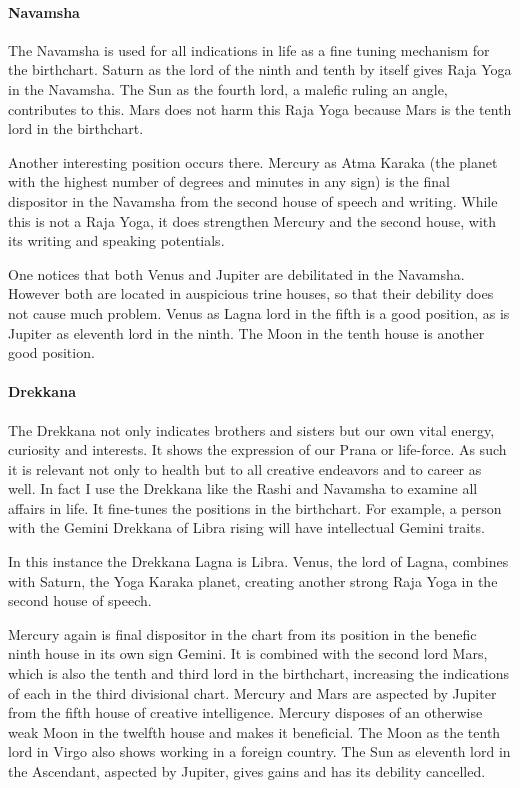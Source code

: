  

\paragraph{Navamsha}

The Navamsha is used for all indications in life as a fine tuning mechanism for the birthchart. Saturn as the lord of the ninth and tenth by itself gives Raja Yoga in the Navamsha. The Sun as the fourth lord, a malefic ruling an angle, contributes to this. Mars does not harm this Raja Yoga because Mars is the tenth lord in the birthchart.

 

Another interesting position occurs there. Mercury as Atma Karaka (the planet with the highest number of degrees and minutes in any sign) is the final dispositor in the Navamsha from the second house of speech and writing. While this is not a Raja Yoga, it does strengthen Mercury and the second house, with its writing and speaking potentials.

 

One notices that both Venus and Jupiter are debilitated in the Navamsha. However both are located in auspicious trine houses, so that their debility does not cause much problem. Venus as Lagna lord in the fifth is a good position, as is Jupiter as eleventh lord in the ninth. The Moon in the tenth house is another good position.

 

\paragraph{Drekkana}

The Drekkana not only indicates brothers and sisters but our own vital energy, curiosity and interests. It shows the expression of our Prana or life-force. As such it is relevant not only to health but to all creative endeavors and to career as well. In fact I use the Drekkana like the Rashi and Navamsha to examine all affairs in life. It fine-tunes the positions in the birthchart. For example, a person with the Gemini Drekkana of Libra rising will have intellectual Gemini traits.

 

In this instance the Drekkana Lagna is Libra. Venus, the lord of Lagna, combines with Saturn, the Yoga Karaka planet, creating another strong Raja Yoga in the second house of speech.

 

Mercury again is final dispositor in the chart from its position in the benefic ninth house in its own sign Gemini. It is combined with the second lord Mars, which is also the tenth and third lord in the birthchart, increasing the indications of each in the third divisional chart. Mercury and Mars are aspected by Jupiter from the fifth house of creative intelligence. Mercury disposes of an otherwise weak Moon in the twelfth house and makes it beneficial. The Moon as the tenth lord in Virgo also shows working in a foreign country. The Sun as eleventh lord in the Ascendant, aspected by Jupiter, gives gains and has its debility cancelled.

